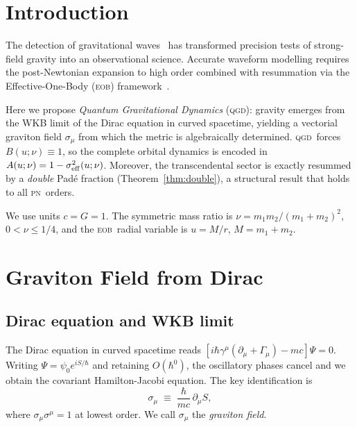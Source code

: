 \documentclass[twocolumn,aps,prd,showpacs,superscriptaddress,floatfix]{revtex4-2}
\newcommand{\sigeq}{\sigma_{\rm eff}^2}
\newcommand{\QGD}{\textsc{qgd}}
\newcommand{\EOB}{\textsc{eob}}
\newcommand{\PN}{\textsc{pn}}
\begin{document}
\section{Introduction}
\label{sec:intro}

The detection of gravitational waves~\cite{Abbott:2016blz} has transformed
precision tests of strong-field gravity into an observational science.
Accurate waveform modelling requires the post-Newtonian expansion to
high order combined with resummation via the Effective-One-Body (\EOB)
framework~\cite{Buonanno:1998gg}.

Here we propose \textit{Quantum Gravitational Dynamics} (\QGD): gravity
emerges from the WKB limit of the Dirac equation in curved spacetime,
yielding a vectorial graviton field $\sigma_\mu$ from which the metric
is algebraically determined.
\QGD\ forces $B(u;\nu)\equiv1$, so the complete orbital dynamics is
encoded in $A(u;\nu)=1-\sigeq(u;\nu)$.
Moreover, the transcendental sector is exactly resummed by a
\emph{double} Pad\'e fraction (Theorem~\ref{thm:double}), a structural
result that holds to all \PN\ orders.

We use units $c=G=1$.
The symmetric mass ratio is $\nu=m_1m_2/(m_1+m_2)^2$, $0<\nu\le1/4$,
and the \EOB\ radial variable is $u=M/r$, $M=m_1+m_2$.

\section{Graviton Field from Dirac}
\label{sec:micro}

\subsection{Dirac equation and WKB limit}

The Dirac equation in curved spacetime reads
$[i\hbar\gamma^\mu(\partial_\mu+\Gamma_\mu)-mc]\Psi=0$.
Writing $\Psi=\psi_0e^{iS/\hbar}$ and retaining $O(\hbar^0)$, the
oscillatory phases cancel and we obtain the covariant Hamilton-Jacobi
equation.  The key identification is
\begin{equation}
  \boxed{\sigma_\mu \;\equiv\; \frac{\hbar}{mc}\,\partial_\mu S,}
  \label{eq:sigma}
\end{equation}
where $\sigma_\mu\sigma^\mu=1$ at lowest order.  We call $\sigma_\mu$
the \textit{graviton field}.
\end{document}
